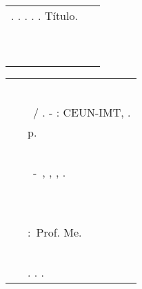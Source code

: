 \begin{fichacatalografica}
\begin{table}[!b]
\begin{tabular}{|L{1cm}L{11.5cm}|}
{     	 
     	. \IMT. \CEUN. \imprimirinstituicao. 
     	. Tí­tulo.}	\\
			~ & ~ \\
			~ & \hspace{9cm}
			{\fontsize{9pt}{1cm}\selectfont \CDU} \\
 	 		\hline
  		\end{tabular}
	\end{table}
\else
	\begin{table}[!b]
	\centering
  		\setlength{\arrayrulewidth}{0.75pt}
		\begin{tabular}{|L{1cm}L{11.5cm}|}
			\hline
			~ & ~ \\
            & 
			{\fontsize{9pt}{9pt}\selectfont \AFulano}\\
			~ & {\fontsize{9pt}{9pt}\selectfont \hspace{0.37cm}
			\imprimirtitulo\ / \ifthenelse{\equal{\FulanoASnome}{}}{}{\FulanoA}\ifthenelse{\equal{\FulanoBSnome}{}}{}{, \FulanoB}\ifthenelse{\equal{\FulanoCSnome}{}}{}{, \FulanoC}. - \imprimirlocal: CEUN-IMT, \imprimirdata.}\\
			~ & {\fontsize{9pt}{9pt}\selectfont \hspace{0.37cm} \pageref{LastPage} p.}\\
			~ & ~ \\
			~ & \hspace{0.37cm}
			{\fontsize{9pt}{1cm}\selectfont \imprimirtipotrabalho~-~\EscolaCompleto, \imprimirlocal, \Estado, \imprimirdata.}\\
			~ & ~ \\
			~ & ~ \\
			~ & \hspace{0.37cm}
			{\fontsize{9pt}{1cm}\selectfont \imprimirorientadorRotulo:~Prof. Me.~\imprimirorientador}\\	
			~ & ~ \\
			~ & \hspace{0.37cm}
			{\fontsize{9pt}{1cm}\selectfont 
			. 
			. 
			. 
}
\end{tabular}
\end{table}
\end{fichacatalografica}
